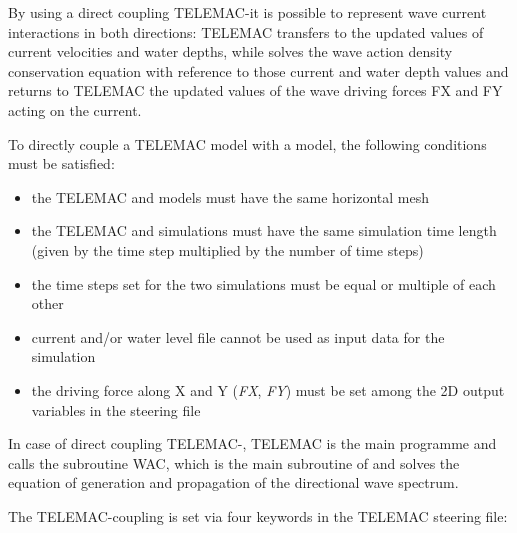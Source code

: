  By using a direct coupling TELEMAC-\tomawac it is possible to represent wave current interactions in both directions: TELEMAC transfers to \tomawac the updated values of current velocities and water depths, while \tomawac solves the wave action density conservation equation with reference to those current and water depth values and returns to TELEMAC the updated values of the wave driving forces FX and FY acting on the current.

 To directly couple a TELEMAC model with a \tomawac model, the following conditions must be satisfied:

\begin{itemize}
\item  the TELEMAC and \tomawac models must have the same horizontal mesh

\item  the TELEMAC and \tomawac simulations must have the same simulation time length (given by the time step multiplied by the number of time steps)

\item  the time steps set for the two simulations must be equal or multiple of each other

\item  current and/or water level file cannot be used as input data for the \tomawac simulation

\item  the driving force along X and Y (\textit{FX}, \textit{FY}) must be set among the 2D output variables in the steering file
\end{itemize}

 In case of direct coupling TELEMAC-\tomawac, TELEMAC is the main programme and calls the \tomawac subroutine WAC, which is the main subroutine of \tomawac and solves the equation of generation and propagation of the directional wave spectrum.

 The TELEMAC-\tomawac coupling is set via four keywords in the TELEMAC steering file:

